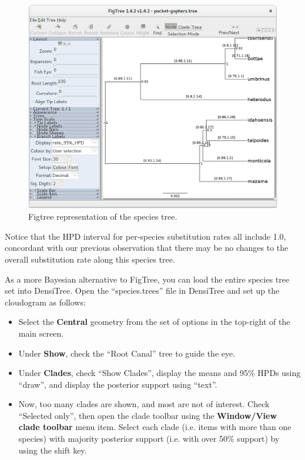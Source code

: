 \documentclass{article}
\begin{document}
\begin{figure}[htb!]
\centering
\includegraphics[width=\textwidth]{figures/figtree.png}
\caption{Figtree representation of the species tree.}
\label{fig:figtree}
\end{figure}

Notice that the HPD interval for per-species substitution rates all include
1.0, concordant with our previous observation that there may be no changes
to the overall substitution rate along this species tree.

As a more Bayesian alternative to FigTree, you can load the entire species tree
set into DensiTree. Open the ``species.trees'' file in DensiTree and set up the
cloudogram as follows:

\begin{itemize}
\item Select the \textbf{Central} geometry from the set of options in the top-right of the main screen.
\item Under \textbf{Show}, check the ``Root Canal'' tree to guide the eye.
\item Under \textbf{Clades}, check ``Show Clades'', display the means and 95\% HPDs using ``draw'', and display the posterior support
using ``text''.
\item Now, too many clades are shown, and most are not of interest. Check
``Selected only'', then open the clade toolbar using the \textbf{Window/View
clade toolbar} menu item. Select each clade (i.e.
items with more than one species) with majority posterior support (i.e.
with over 50\% support) by using the
shift key.
\end{itemize}
\end{document}
